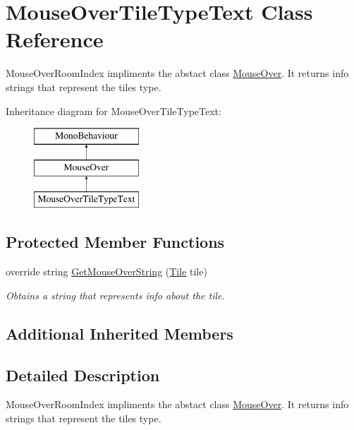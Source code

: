 \hypertarget{class_mouse_over_tile_type_text}{}\section{Mouse\+Over\+Tile\+Type\+Text Class Reference}
\label{class_mouse_over_tile_type_text}


Mouse\+Over\+Room\+Index impliments the abstact class \hyperlink{class_mouse_over}{Mouse\+Over}. It returns info strings that represent the tiles type.  


Inheritance diagram for Mouse\+Over\+Tile\+Type\+Text\+:\begin{figure}[H]
\begin{center}
\leavevmode
\includegraphics[height=3.000000cm]{class_mouse_over_tile_type_text}
\end{center}
\end{figure}
\subsection*{Protected Member Functions}
\begin{DoxyCompactItemize}
\item 
override string \hyperlink{class_mouse_over_tile_type_text_a37c845af19b0857a71a8827058186d9f}{Get\+Mouse\+Over\+String} (\hyperlink{class_tile}{Tile} tile)
\begin{DoxyCompactList}\small\item\em Obtains a string that represents info about the tile. \end{DoxyCompactList}\end{DoxyCompactItemize}
\subsection*{Additional Inherited Members}


\subsection{Detailed Description}
Mouse\+Over\+Room\+Index impliments the abstact class \hyperlink{class_mouse_over}{Mouse\+Over}. It returns info strings that represent the tiles type. 



